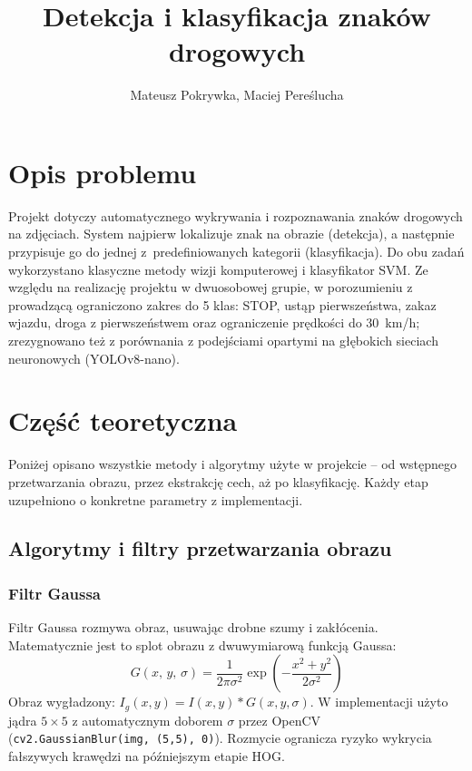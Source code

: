 \documentclass[12pt,oneside]{article}
\author{Mateusz Pokrywka, Maciej Pereślucha}
\title{Detekcja i klasyfikacja znaków drogowych}
\begin{document}
\maketitle
\tableofcontents
\clearpage

\section{Opis problemu}
Projekt dotyczy automatycznego wykrywania i rozpoznawania znaków drogowych na zdjęciach.
System najpierw lokalizuje znak na obrazie (detekcja), a następnie przypisuje go do jednej
z~predefiniowanych kategorii (klasyfikacja). Do obu zadań wykorzystano klasyczne metody
wizji komputerowej i klasyfikator SVM. Ze względu na realizację projektu w dwuosobowej
grupie, w porozumieniu z prowadzącą ograniczono zakres do 5 klas: STOP, ustąp
pierwszeństwa, zakaz wjazdu, droga z pierwszeństwem oraz ograniczenie prędkości do
30~km/h; zrezygnowano też z porównania z podejściami opartymi na głębokich sieciach
neuronowych (YOLOv8-nano).

\section{Część teoretyczna}
Poniżej opisano wszystkie metody i algorytmy użyte w projekcie -- od wstępnego
przetwarzania obrazu, przez ekstrakcję cech, aż po klasyfikację. Każdy etap uzupełniono
o konkretne parametry z implementacji.

\subsection{Algorytmy i filtry przetwarzania obrazu}

\subsubsection{Filtr Gaussa}
Filtr Gaussa rozmywa obraz, usuwając drobne szumy i zakłócenia. Matematycznie jest to
splot obrazu z dwuwymiarową funkcją Gaussa:
\begin{equation}
    G(x,\, y,\, \sigma) = \frac{1}{2\pi\sigma^2}
    \exp\!\left(-\frac{x^2 + y^2}{2\sigma^2}\right)
    \label{eq:gauss}
\end{equation}
Obraz wygładzony: $I_g(x,y) = I(x,y) * G(x,y,\sigma)$. W implementacji użyto jądra
$5 \times 5$ z automatycznym doborem $\sigma$ przez OpenCV
(\texttt{cv2.GaussianBlur(img, (5,5), 0)}). Rozmycie ogranicza ryzyko wykrycia
fałszywych krawędzi na późniejszym etapie HOG.
\end{document}
